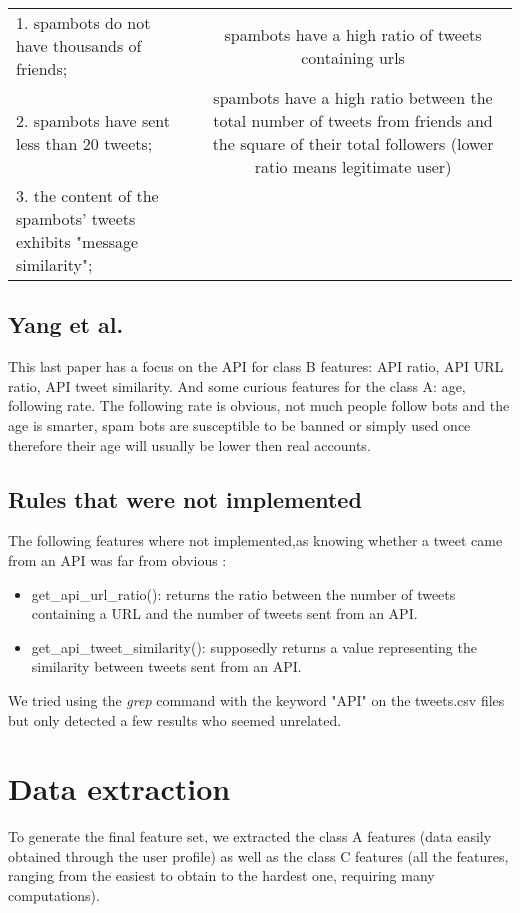 \documentclass[a4paper,11pt]{article}
\begin{document}
\begin{tabular}{lc}
\hline
1. spambots do not have thousands of friends; & spambots have a high ratio of tweets containing urls\\
2. spambots have sent less than 20 tweets; & spambots have a high ratio between the total number of tweets from friends and the square of their total followers (lower ratio means legitimate user)\\
3. the content of the spambots' tweets exhibits "message similarity"; & \\
\hline
\end{tabular}


\subsection{Yang et al.}
This last paper has a focus on the API for class B features: API ratio, API URL ratio, API tweet similarity. And some curious features for the class A: age, following rate. The following rate is obvious, not much people follow bots and the age is smarter, spam bots are susceptible to be banned or simply used once therefore their age will usually be lower then real accounts.

\subsection{Rules that were not implemented}
The following features where not implemented,as knowing whether a tweet came from an API was far from obvious : \\

\begin{itemize}
\item{get\_api\_url\_ratio(): returns the ratio between the number of tweets containing a URL and the number of tweets sent from an API.}
\item{get\_api\_tweet\_similarity(): supposedly returns a value representing the similarity between tweets sent from an API.}
\end{itemize} 

We tried using the \textit{grep} command with the keyword "API" on the tweets.csv files but only detected a few results who seemed unrelated.

\section{Data extraction}
To generate the final feature set, we extracted the class A features (data easily obtained through the user profile) as well as the class C features (all the features, ranging from the easiest to obtain to the hardest one, requiring many computations).\\
\end{document}
